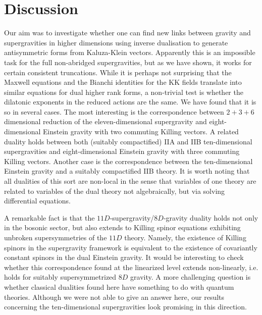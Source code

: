 \documentclass[a4paper,12pt]{article}
\begin{document}
\section{Discussion}
Our aim was to investigate whether one can find new links
between gravity and supergravities in higher dimensions using
inverse dualisation to generate antisymmetric forms from
Kaluza-Klein vectors. Apparently this is an impossible task for
the full non-abridged supergravities, but as we have shown, it
works for certain consistent truncations. While it is perhaps
not surprising that the Maxwell equations and the Bianchi
identities for the KK fields translate into similar equations
for dual higher rank forms, a non-trivial test is whether the
dilatonic exponents in the reduced actions are the same. We
have found that it is so in several cases. The most interesting
is the correspondence between $2+3+6$ dimensional reduction of
the eleven-dimensional supergravity and eight-dimensional
Einstein gravity with two commuting Killing vectors. A related
duality holds between both (suitably compactified) IIA and IIB
ten-dimensional supergravities and eight-dimensional Einstein
gravity with three commuting Killing vectors. Another case is
the correspondence between the ten-dimensional Einstein gravity
and a suitably compactified IIB theory. It is worth noting that
all dualities of this sort are non-local in the sense that
variables of one theory are related to  variables of the dual
theory not algebraically, but via solving differential
equations.

A remarkable fact is that the $11D$-supergravity/$8D$-gravity
duality holds not only in the bosonic sector, but also extends
to Killing spinor equations exhibiting unbroken supersymmetries
of the $11D$ theory. Namely, the existence of Killing spinors
in the supergravity framework is equivalent to the existence of
covariantly constant spinors in the dual Einstein gravity. It
would be interesting to check whether this correspondence found
at the linearized level extends non-linearly, i.e. holds for
suitably supersymmetrized $8D$ gravity. A more challenging
question is whether classical dualities found here have
something to do with quantum theories. Although we were not
able to give an answer here, our results concerning the
ten-dimensional supergravities look promising in this direction.
\end{document}
